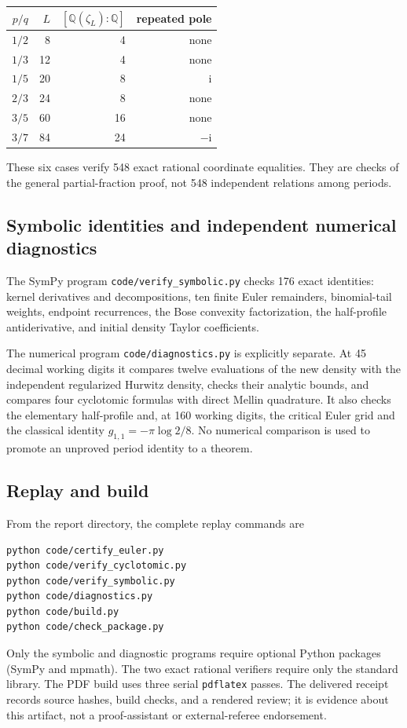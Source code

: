 \documentclass[11pt]{article}
\numberwithin{equation}{section}
\theoremstyle{definition}\newtheorem{definition}[theorem]{Definition}
\theoremstyle{remark}\newtheorem{remark}[theorem]{Remark}
\newcommand{\ii}{\mathrm i}
\newcommand{\Q}{\mathbb Q}
\begin{document}
\begin{center}\small
\begin{tabular}{@{}rrrr@{}}
\toprule
$p/q$ & $L$ & $[\Q(\zeta_L):\Q]$ & repeated pole\\
\midrule
$1/2$&8&4&none\\
$1/3$&12&4&none\\
$1/5$&20&8&$\ii$\\
$2/3$&24&8&none\\
$3/5$&60&16&none\\
$3/7$&84&24&$-\ii$\\
\bottomrule
\end{tabular}
\end{center}
These six cases verify 548 exact rational coordinate equalities.
They are checks of the general partial-fraction proof, not 548
independent relations among periods.

\subsection{Symbolic identities and independent numerical diagnostics}
The SymPy program \texttt{code/verify\_symbolic.py} checks 176 exact
identities: kernel derivatives and decompositions, ten finite Euler
remainders, binomial-tail weights, endpoint recurrences, the Bose
convexity factorization, the half-profile antiderivative, and initial
density Taylor coefficients.

The numerical program \texttt{code/diagnostics.py} is explicitly
separate. At 45 decimal working digits it compares twelve evaluations
of the new density with the independent regularized Hurwitz density,
checks their analytic bounds, and compares four cyclotomic formulas
with direct Mellin quadrature. It also checks the elementary
half-profile and, at 160 working digits, the critical Euler grid and
the classical identity $g_{1,1}=-\pi\log2/8$.
No numerical comparison is used to promote an unproved period identity
to a theorem.

\subsection{Replay and build}
From the report directory, the complete replay commands are
\begin{verbatim}
python code/certify_euler.py
python code/verify_cyclotomic.py
python code/verify_symbolic.py
python code/diagnostics.py
python code/build.py
python code/check_package.py
\end{verbatim}
Only the symbolic and diagnostic programs require optional Python
packages (SymPy and mpmath). The two exact rational verifiers require
only the standard library. The PDF build uses three serial
\texttt{pdflatex} passes. The delivered receipt records source hashes,
build checks, and a rendered review; it is evidence about this artifact,
not a proof-assistant or external-referee endorsement.
\end{document}
